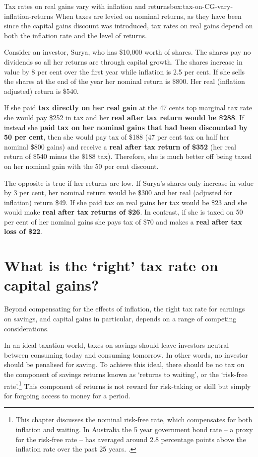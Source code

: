 \documentclass{grattanAlpha}\usepackage[]{graphicx}\usepackage[]{color}
\begin{document}
\begin{smallbox}{Tax rates on real gains vary with inflation and returns}{box:tax-on-CG-vary-inflation-returns}
When taxes are levied on nominal returns, as they have been since the capital gains discount was introduced, tax rates on real gains depend on both the inflation rate and the level of returns. 

Consider an investor, Surya, who has \$10,000 worth of shares. The shares pay no dividends so all her returns are through capital growth. The shares increase in value by 8 per cent over the first year while inflation is 2.5 per cent. If she sells the shares at the end of the year her nominal return is \$800. Her real (inflation adjusted) return is \$540. 

If she paid \textbf{tax directly on her real gain} at the 47 cents top marginal tax rate she would pay \$252 in tax and her \textbf{real after tax return would be \$288}. If instead she \textbf{paid tax on her nominal gains that had been discounted by 50 per cent}, then she would pay tax of \$188 (47 per cent tax on half her nominal \$800 gains) and receive a \textbf{real after tax return of \$352} (her real return of \$540 minus the \$188 tax). Therefore, she is much better off being taxed on her nominal gain with the 50 per cent discount. 

The opposite is true if her returns are low. If Surya’s shares only increase in value by 3 per cent, her nominal return would be \$300 and her real (adjusted for inflation) return \$49. If she paid tax on real gains her tax would be \$23 and she would make \textbf{real after tax returns of \$26}. In contrast, if she is taxed on 50 per cent of her nominal gains she pays tax of \$70 and makes a \textbf{real after tax loss of \$22}.
\end{smallbox}



\section{What is the `right' tax rate on capital gains?}\label{sec:What-is-the-right-tax-rate-on-capital-gains}
Beyond compensating for the effects of inflation, the right tax rate for earnings on savings, and capital gains in particular, depends on a range of competing considerations. 

In an ideal taxation world, taxes on savings should leave investors neutral between consuming today and consuming tomorrow. In other words, no investor should be penalised for saving. To achieve this ideal, there should be no tax on the component of savings returns known as ‘returns to waiting’, or the ‘risk-free rate’.\footnote{This chapter discusses the nominal risk-free rate, which compensates for both inflation and waiting. In Australia the 5 year government bond rate – a proxy for the risk-free rate – has averaged around 2.8 percentage points above the inflation rate over the past 25 years. \textcite{RBA2015CapitalMarketYields}.} This component of returns is not reward for risk-taking or skill but simply for forgoing access to money for a period. 
\end{document}

